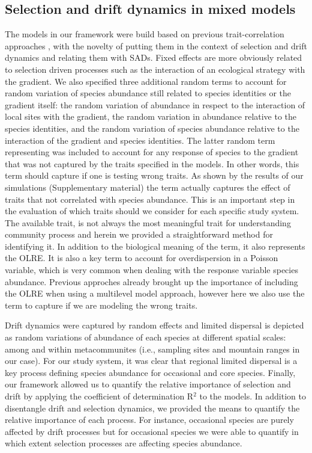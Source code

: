 \documentclass[12pt]{article}
\begin{document}

\subsection*{Selection and drift dynamics in mixed models }

The models in our framework were build based on previous trait-correlation approaches \citep{Pollock2012, Jamil2013, Jamil2013a, Miller2019, TerBraak2019}, with the novelty of putting them in the context of selection and drift dynamics and relating them with SADs. Fixed effects are more obviously related to selection driven processes such as the interaction of an ecological strategy with the gradient. We also specified three additional random terms to account for random variation of species abundance still related to species identities or the gradient itself: the random variation of abundance in respect to the interaction of local sites with the gradient, the random variation in abundance relative to the species identities, and the random variation of species abundance relative to the interaction of the gradient and species identities. The latter random term representing was included to account for any response of species to the gradient that was not captured by the traits specified in the models. In other words, this term should capture if one is testing wrong traits. As shown by the results of our simulations (Supplementary material) the term actually captures the effect of traits that not correlated with species abundance. This is an important step in the evaluation of which traits should we consider for each specific study system. The available trait, is not always the most meaningful trait for understanding community process and herein we provided a straightforward method for identifying it. In addition to the biological meaning of the term, it also represents the OLRE. It is also a key term to account for overdispersion in a Poisson variable, which is very common when dealing with the response variable species abundance. Previous approches \citep{Miller2019, TerBraak2019} already brought up the importance of including the OLRE when using a multilevel model approach, however here we also use the term to capture if we are modeling the wrong traits. 

Drift dynamics were captured by random effects and limited dispersal is depicted as random variations of abundance of each species at different spatial scales: among and within metacommunites (i.e., sampling sites and mountain ranges in our case). For our study system, it was clear that regional limited dispersal is a key process defining species abundance for occasional and core species. Finally, our framework allowed us to quantify the relative importance of selection and drift by applying the coefficient of determination R{$^2$} \citep{Nakagawa2013, Nakagawa2017} to the models. In addition to disentangle drift and selection dynamics, we provided the means to quantify the relative importance of each process. For instance, occasional species are purely affected by drift processes but for occasional species we were able to quantify in which extent selection processes are affecting species abundance. 
\end{document}
